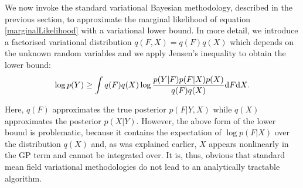 We now invoke the standard variational Bayesian methodology, described in the previous section,
to approximate the marginal likelihood of equation \eqref{marginalLikelihood} with a variational lower bound.
In more detail, we introduce a factorised variational distribution $q(F,X)=q(F)q(X)$ which depends
on the unknown random variables and we apply Jensen's inequality to obtain the lower bound:
\begin{equation}
\log p(Y) \ge %
       \int q(F)q(X) \log \frac{p(Y|F) p(F|X) p(X)}{q(F)q(X)} \intd F \intd X . \label{jensens1}
\end{equation}


%
%
%
Here, $q(F)$ approximates the true posterior $p(F|Y,X)$ while $q(X)$ approximates the posterior $p(X|Y)$.
However, the above form of the lower bound is problematic, because it contains the expectation
of $\log p(F|X)$ over the distribution $q(X)$ and, as was explained earlier, $X$ appears nonlinearly
in the GP term and cannot be integrated over.
It is, thus, obvious that standard mean field variational methodologies do not lead to an analytically
tractable algorithm.

